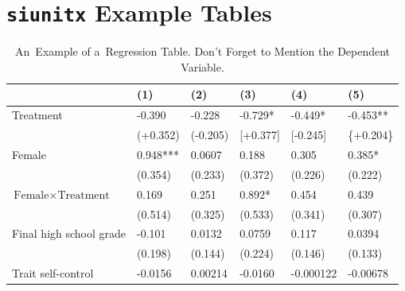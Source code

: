 



\section{\texttt{siunitx} Example Tables}
\label{sec:app:example_tables}

\begin{table}[h!]
\caption{An~Example of a~Regression Table. Don't Forget to Mention the Dependent Variable.}
\label{tab:lin_reg_interactions}
\footnotesize
\newcolumntype{T}{S[table-format=+1.3, round-mode=places, round-precision=3, table-space-text-pre={**}, table-space-text-post={-**}, round-integer-to-decimal=false]}
\begin{tabularx}
	{\textwidth}
	{@{} L @{\hspace{1.5em}} T @{\hspace{1em}} T @{\hspace{1em}} T @{\hspace{1em}} T @{\hspace{1em}} T @{}}
\toprule
&	{(1)}	&	{(2)}	&	{(3)}	&	{(4)}	&	{(5)} \\
\midrule
Treatment
	&	-0.390	&	-0.228	&	-0.729*	&	-0.449*	&	-0.453**	\\
	&	(+0.352)	&	(-0.205)	&	[+0.377]	&	[-0.245]	&	{\{}+0.204{\}}	\\
Female
	&	0.948***	&	0.0607	&	0.188	&	0.305	&	0.385*	\\
	&	(0.354)	&	(0.233)	&	(0.372)	&	(0.226)	&	(0.222)	\\
$\text{Female} \times \text{Treatment}$
	&	0.169	&	0.251	&	0.892*	&	0.454	&	0.439	\\
	&	(0.514)	&	(0.325)	&	(0.533)	&	(0.341)	&	(0.307)	\\
Final high school grade
	&	-0.101	&	0.0132	&	0.0759	&	0.117	&	0.0394	\\
	&	(0.198)	&	(0.144)	&	(0.224)	&	(0.146)	&	(0.133)	\\
Trait self-control
	&	-0.0156	&	0.00214	&	-0.0160	&	-0.000122	&	-0.00678	\\

\end{tabularx}
\end{table}
